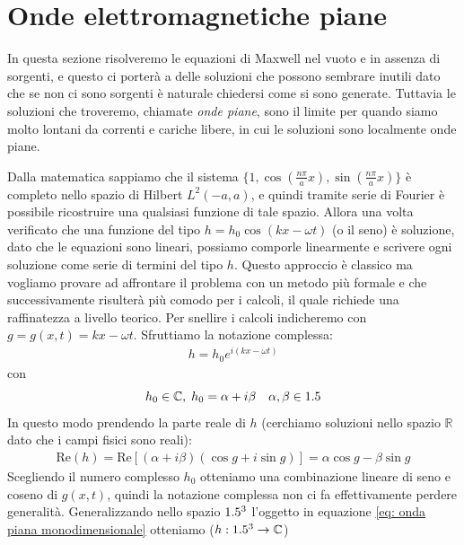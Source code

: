 \section{Onde elettromagnetiche piane} \label{section:_Onde_elettromagnetiche}
In questa sezione risolveremo le equazioni di Maxwell nel vuoto e in assenza di sorgenti, e questo ci porterà a delle soluzioni che possono sembrare 
inutili dato che se non ci sono sorgenti è naturale chiedersi come si sono generate. Tuttavia le soluzioni che troveremo, chiamate \textit{onde piane}, sono 
il limite per quando siamo molto lontani da correnti e cariche libere, in cui le soluzioni sono localmente onde piane.

Dalla matematica sappiamo che il sistema $ \{1, \cos\left( \frac{n\pi}{a} x \right), \sin\left( \frac{n\pi}{a} x \right)\} $ è completo nello spazio di 
Hilbert $ L^2(-a, a) $, e quindi tramite serie di Fourier è possibile ricostruire una qualsiasi funzione di tale spazio. Allora una volta verificato che 
una funzione del tipo $ h = h_0\cos(kx - \omega t) $ (o il seno) è soluzione, dato che le equazioni sono lineari, possiamo comporle linearmente e scrivere 
ogni soluzione come serie di termini del tipo $ h $. Questo approccio è classico ma vogliamo provare ad affrontare il problema 
con un metodo più formale e che successivamente risulterà più comodo per i calcoli, il quale richiede una raffinatezza a livello teorico. 
Per snellire i calcoli indicheremo con $ g = g (x,t) = kx - \omega t $. Sfruttiamo la notazione complessa:
\begin{align}
  h = h_0 e^{i \left( kx - \omega t \right)} 
\end{align} \label{eq: onda piana monodimensionale}
con
\begin{equation}
  h_0 \in \mathbb{C},\; h_0 = \alpha + i \beta \quad \alpha, \beta \in 1.5
\end{equation}
In questo modo prendendo la parte reale di $ h $ (cerchiamo soluzioni nello spazio $ \mathbb{R} $ dato che i campi fisici sono reali):
\begin{align}
  \text{Re}\left( h \right) = \text{Re} \left[ (\alpha + i \beta)\left( \cos g + i \sin g \right) \right] = \alpha \cos g - \beta \sin g
\end{align}
Scegliendo il numero complesso $ h_0 $ otteniamo una combinazione lineare di seno e coseno di $ g(x,t) $, quindi la notazione complessa non ci fa 
effettivamente perdere generalità. Generalizzando nello spazio $ 1.5^3 $ l'oggetto in equazione \eqref{eq: onda piana monodimensionale} otteniamo 
($ h:1.5^3 \to \mathbb{C} $)
